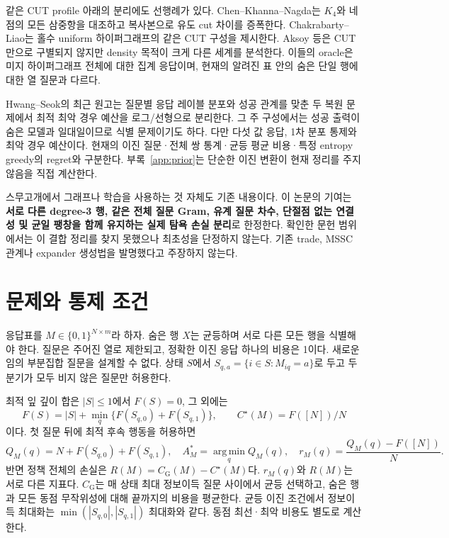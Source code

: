\documentclass[11pt,a4paper]{article}
\theoremstyle{definition}
\theoremstyle{remark}\newtheorem{remark}[theorem]{주석}
\newcommand{\Opt}{C^{\star}}
\newcommand{\Greedy}{C_{\mathrm G}}
\newcommand{\Reg}{R}
\newcommand{\argmin}{\operatorname*{arg\,min}}
\begin{document}
같은 CUT profile 아래의 분리에도 선행례가 있다. Chen--Khanna--Nagda\cite{ckn}는 $K_4$와 네 점의 모든 삼중항을 대조하고 복사본으로 유도 cut 차이를 증폭한다. Chakrabarty--Liao\cite{cl}는 홀수 uniform 하이퍼그래프의 같은 CUT 구성을 제시한다. Aksoy 등\cite{aksoy}은 CUT만으로 구별되지 않지만 density 목적이 크게 다른 세계를 분석한다. 이들의 oracle은 미지 하이퍼그래프 전체에 대한 집계 응답이며, 현재의 알려진 표 안의 숨은 단일 행에 대한 열 질문과 다르다.

Hwang--Seok\cite{hs}의 최근 원고는 질문별 응답 레이블 분포와 성공 관계를 맞춘 두 복원 문제에서 최적 최악 경우 예산을 로그/선형으로 분리한다. 그 주 구성에서는 성공 출력이 숨은 모델과 일대일이므로 식별 문제이기도 하다. 다만 다섯 값 응답, 1차 분포 통제와 최악 경우 예산이다. 현재의 이진 질문·전체 쌍 통계·균등 평균 비용·특정 entropy greedy의 regret와 구분한다. 부록~\ref{app:prior}는 단순한 이진 변환이 현재 정리를 주지 않음을 직접 계산한다.

스무고개에서 그래프나 학습을 사용하는 것 자체도 기존 내용이다\cite{kazemzadeh,chenask,dey,wang}. 이 논문의 기여는 \textbf{서로 다른 degree-3 행, 같은 전체 질문 Gram, 유계 질문 차수, 단절점 없는 연결성 및 균일 팽창을 함께 유지하는 실제 탐욕 손실 분리}로 한정한다. 확인한 문헌 범위에서는 이 결합 정리를 찾지 못했으나 최초성을 단정하지 않는다. 기존 trade, MSSC 관계나 expander 생성법을 발명했다고 주장하지 않는다.

\section{문제와 통제 조건}\label{sec:model}
응답표를 $M\in\{0,1\}^{N\times m}$라 하자. 숨은 행 $X$는 균등하며 서로 다른 모든 행을 식별해야 한다. 질문은 주어진 열로 제한되고, 정확한 이진 응답 하나의 비용은 1이다. 새로운 임의 부분집합 질문을 설계할 수 없다. 상태 $S$에서 $S_{q,a}=\{i\in S:M_{iq}=a\}$로 두고 두 분기가 모두 비지 않은 질문만 허용한다.

최적 잎 깊이 합은 $|S|\le1$에서 $F(S)=0$, 그 외에는
\begin{equation}\label{eq:dp}
 F(S)=|S|+\min_q\{F(S_{q,0})+F(S_{q,1})\},\qquad \Opt(M)=F([N])/N
\end{equation}
이다. 첫 질문 뒤에 최적 후속 행동을 허용하면
\begin{equation}\label{eq:first}
 Q_M(q)=N+F(S_{q,0})+F(S_{q,1}),\quad
 A_M^*=\argmin_q Q_M(q),\quad r_M(q)=\frac{Q_M(q)-F([N])}{N}.
\end{equation}
반면 정책 전체의 손실은 $\Reg(M)=\Greedy(M)-\Opt(M)$다. $r_M(q)$와 $\Reg(M)$는 서로 다른 지표다. $\Greedy$는 매 상태 최대 정보이득 질문 사이에서 균등 선택하고, 숨은 행과 모든 동점 무작위성에 대해 끝까지의 비용을 평균한다. 균등 이진 조건에서 정보이득 최대화는 $\min(|S_{q,0}|,|S_{q,1}|)$ 최대화와 같다. 동점 최선·최악 비용도 별도로 계산한다.
\end{document}
